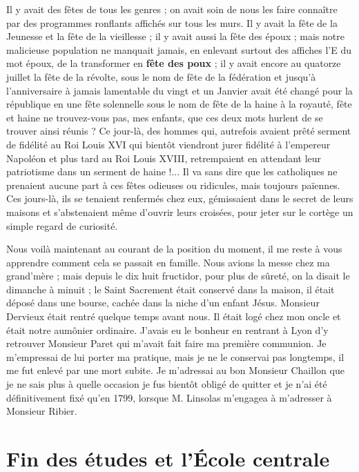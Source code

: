 \documentclass[11pt,a4paper]{report}
\begin{document}
Il y avait des fêtes de tous les genres ; on avait soin de nous les faire connaître par des programmes ronflants affichés sur tous les murs. Il y avait la fête de la Jeunesse et la fête de la vieillesse ; il y avait aussi la fête des époux ; mais notre malicieuse population ne manquait jamais, en enlevant surtout des affiches l'E du mot époux, de la transformer en \textbf{fête des poux} ; il y avait encore au quatorze juillet la fête de la révolte, sous le nom de fête de la fédération et jusqu'à l'anniversaire à jamais lamentable du vingt et un Janvier avait été changé pour la république en une fête solennelle sous le nom de fête de la haine à la royauté, fête et haine ne trouvez-vous pas, mes enfants, que ces deux mots hurlent de se trouver ainsi réunis ? Ce jour-là, des hommes qui, autrefois avaient prêté serment de fidélité au Roi Louis XVI qui bientôt viendront jurer fidélité à l'empereur Napoléon et plus tard au Roi Louis XVIII, retrempaient en attendant leur patriotisme dans un serment de haine !... Il va sans dire que les catholiques ne prenaient aucune part à ces fêtes odieuses ou ridicules, mais toujours païennes. Ces jours-là, ils se tenaient renfermés chez eux, gémissaient dans le secret de leurs maisons et s'abstenaient même d'ouvrir leurs croisées, pour jeter sur le cortège un simple regard de curiosité.

Nous voilà maintenant au courant de la position du moment, il me reste à vous apprendre comment cela se passait en famille. Nous avions la messe chez ma grand'mère ; mais depuis le dix huit fructidor, pour plus de sûreté, on la disait le dimanche à minuit ; le Saint Sacrement était conservé dans la maison, il était déposé dans une bourse, cachée dans la niche d'un enfant Jésus. Monsieur Dervieux était rentré quelque temps avant nous. Il était logé chez mon oncle et était notre aumônier ordinaire. J'avais eu le bonheur en rentrant à Lyon d'y retrouver Monsieur Paret qui m'avait fait faire ma première communion. Je m'empressai de lui porter ma pratique, mais je ne le conservai pas longtemps, il me fut enlevé par une mort subite. Je m'adressai au bon Monsieur Chaillon que je ne sais plus à quelle occasion je fus bientôt obligé de quitter et je n'ai été définitivement fixé qu'en 1799, lorsque M. Linsolas m'engagea à m'adresser à Monsieur Ribier.

\section*{Fin des études et l'École centrale}
\end{document}
